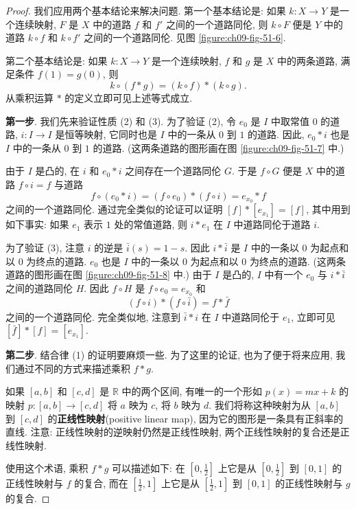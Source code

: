 \begin{proof}
我们应用两个基本结论来解决问题. 第一个基本结论是: 如果 $k\colon X\to Y$ 是一个连续映射, $F$ 是 $X$ 中的道路 $f$ 和 $f'$ 之间的一个道路同伦, 则 $k\circ F$ 便是 $Y$ 中的道路 $k\circ f$ 和 $k\circ f'$ 之间的一个道路同伦. 见图 \cref{figure:ch09-fig-51-6}.


第二个基本结论是: 如果 $k\colon X\to Y$ 是一个连续映射, $f$ 和 $g$ 是 $X$ 中的两条道路, 满足条件 $f(1)=g(0)$, 则
\[
k\circ(f*g)=(k\circ f)*(k\circ g).
\]
从乘积运算 $*$ 的定义立即可见上述等式成立.

\textbf{第一步}. 我们先来验证性质 (2) 和 (3). 为了验证 (2), 令 $e_0$ 是 $I$ 中取常值 $0$ 的道路, $i\colon I\to I$ 是恒等映射, 它同时也是 $I$ 中的一条从 $0$ 到 $1$ 的道路. 因此, $e_0*i$ 也是 $I$ 中的一条从 $0$ 到 $1$ 的道路. (这两条道路的图形画在图 \cref{figure:ch09-fig-51-7} 中.)


由于 $I$ 是凸的, 在 $i$ 和 $e_0*i$ 之间存在一个道路同伦 $G$. 于是 $f\circ G$ 便是 $X$ 中的道路 $f\circ i=f$ 与道路
\[
f\circ(e_{0}*i)=(f\circ e_{0})*(f\circ i)=e_{x_{0}}*f
\]
之间的一个道路同伦. 通过完全类似的论证可以证明 $[f]*[e_{x_1}]=[f]$, 其中用到如下事实: 如果 $e_1$ 表示 $1$ 处的常值道路, 则 $i*e_1$ 在 $I$ 中道路同伦于道路 $i$.

为了验证 (3), 注意 $i$ 的逆是 $\bar{i}(s)=1-s$. 因此 $i*\bar{i}$ 是 $I$ 中的一条以 $0$ 为起点和以 $0$ 为终点的道路. $e_0$ 也是 $I$ 中的一条以 $0$ 为起点和以 $0$ 为终点的道路. (这两条道路的图形画在图 \cref{figure:ch09-fig-51-8} 中.) 由于 $I$ 是凸的, $I$ 中有一个 $e_0$ 与 $i*\bar{i}$ 之间的道路同伦 $H$. 因此 $f\circ H$ 是 $f\circ e_0=e_{x_0}$ 和
\[
(f\circ i)*(f\circ\bar{i})=f*\bar{f}
\]
之间的一个道路同伦. 完全类似地, 注意到 $\bar{i}*i$ 在 $I$ 中道路同伦于 $e_1$, 立即可见 $[\bar{f}]*[f]=[e_{x_1}]$.


\textbf{第二步}. 结合律 (1) 的证明要麻烦一些. 为了这里的论证, 也为了便于将来应用, 我们通过不同的方式来描述乘积 $f*g$.

如果 $[a,b]$ 和 $[c,d]$ 是 $\mathbb{R}$ 中的两个区间, 有唯一的一个形如 $p(x)=mx+k$ 的映射 $p\colon[a,b]\to[c,d]$ 将 $a$ 映为 $c$, 将 $b$ 映为 $d$. 我们将称这种映射为从 $[a,b]$ 到 $[c,d]$ 的\textbf{正线性映射}(positive linear map), 因为它的图形是一条具有正斜率的直线. 注意: 正线性映射的逆映射仍然是正线性映射, 两个正线性映射的复合还是正线性映射.

使用这个术语, 乘积 $f*g$ 可以描述如下: 在 $\left[0,\frac{1}{2}\right]$ 上它是从 $\left[0,\frac{1}{2}\right]$ 到 $[0,1]$ 的正线性映射与 $f$ 的复合, 而在 $\left[\frac{1}{2},1\right]$ 上它是从 $\left[\frac{1}{2},1\right]$ 到 $[0,1]$ 的正线性映射与 $g$ 的复合.


\end{proof}
